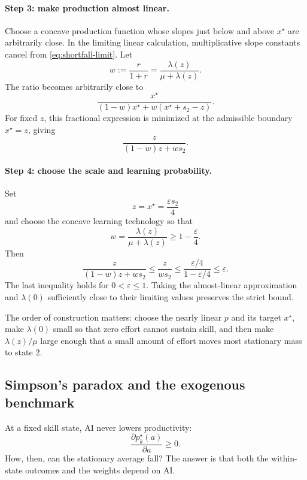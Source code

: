 \documentclass[11pt]{article}
\theoremstyle{tutorial}
\theoremstyle{remark}
\newcommand{\1}{\mathbb{I}}
\begin{document}
\paragraph{Step 3: make production almost linear.}
Choose a concave production function whose slopes just below and above $x^\star$ are arbitrarily close.
In the limiting linear calculation, multiplicative slope constants cancel from
\eqref{eq:shortfall-limit}.  Let
\[
  w:=\frac{r}{1+r}=\frac{\lambda(z)}{\mu+\lambda(z)}.
\]
The ratio becomes arbitrarily close to
\[
  \frac{x^\star}{(1-w)x^\star+w(x^\star+s_2-z)}.
\]
For fixed $z$, this fractional expression is minimized at the admissible boundary $x^\star=z$, giving
\[
  \frac{z}{(1-w)z+ws_2}.
\]

\paragraph{Step 4: choose the scale and learning probability.}
Set
\[
  z=x^\star=\frac{\varepsilon s_2}{4}
\]
and choose the concave learning technology so that
\[
  w=\frac{\lambda(z)}{\mu+\lambda(z)}\ge1-\frac{\varepsilon}{4}.
\]
Then
\[
\frac{z}{(1-w)z+ws_2}
\le\frac{z}{ws_2}
\le\frac{\varepsilon/4}{1-\varepsilon/4}
\le\varepsilon.
\]
The last inequality holds for $0<\varepsilon\le1$.  Taking the almost-linear approximation and
$\lambda(0)$ sufficiently close to their limiting values preserves the strict bound.

The order of construction matters: choose the nearly linear $p$ and its target $x^\star$, make
$\lambda(0)$ small so that zero effort cannot sustain skill, and then make $\lambda(z)/\mu$ large enough
that a small amount of effort moves most stationary mass to state 2.

\subsection{Simpson's paradox and the exogenous benchmark}

At a fixed skill state, AI never lowers productivity:
\[
  \frac{\partial p_k^\star(a)}{\partial a}\ge0.
\]
How, then, can the stationary average fall?  The answer is that both the within-state outcomes and the
weights depend on AI.
\end{document}
